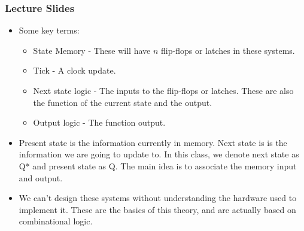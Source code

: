 \documentclass[10pt,a4paper]{article}
\begin{document}
\subsubsection{Lecture Slides}
\begin{itemize}
\item Some key terms:
\begin{itemize}
\item State Memory - These will have $n$ flip-flops or latches in these systems.
\item Tick - A clock update.
\item Next state logic - The inputs to the flip-flops or latches. These are also the function of the current state and the output.
\item Output logic - The function output.
\end{itemize}
\item Present state is the information currently in memory. Next state is is the information we are going to update to. In this class, we denote next state as Q* and present state as Q. The main idea is to associate the memory input and output.
\item We can't design these systems without understanding the hardware used to implement it. These are the basics of this theory, and are actually based on combinational logic. 
\end{itemize}
\end{document}
